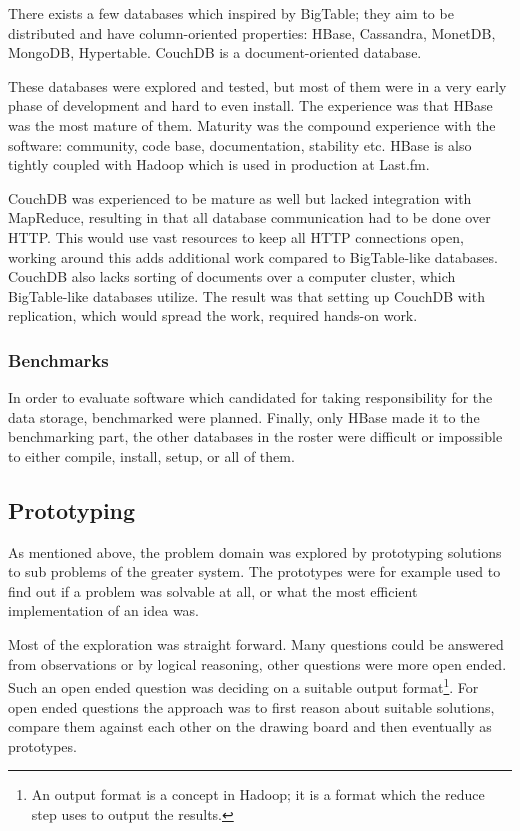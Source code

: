 There exists a few databases which inspired by BigTable; they aim to be
distributed and have column-oriented properties: HBase, Cassandra, MonetDB,
MongoDB, Hypertable. CouchDB is a document-oriented database.

These databases were explored and tested, but most of them were in a very early
phase of development and hard to even install. The experience was that HBase was
the most mature of them. Maturity was the compound experience with the software:
community, code base, documentation, stability etc. HBase is also tightly coupled
with Hadoop which is used in production at Last.fm.

CouchDB was experienced to be mature as well but lacked integration with
MapReduce, resulting in that all database communication had to be done over
HTTP. This would use vast resources to keep all HTTP connections open, working
around this adds additional work compared to BigTable-like databases. CouchDB
also lacks sorting of documents over a computer cluster, which BigTable-like
databases utilize. The result was that setting up CouchDB with replication,
which would spread the work, required hands-on work.


\subsubsection{Benchmarks}

In order to evaluate software which candidated for taking responsibility for the
data storage, benchmarked were planned. Finally, only HBase made it to the
benchmarking part, the other databases in the roster were difficult or
impossible to either compile, install, setup, or all of them.


\subsection*{Prototyping}

As mentioned above, the problem domain was explored by prototyping solutions to
sub problems of the greater system. The prototypes were for example used to find
out if a problem was solvable at all, or what the most efficient implementation
of an idea was.

Most of the exploration was straight forward. Many questions could be answered
from observations or by logical reasoning, other questions were more open ended.
Such an open ended question was deciding on a suitable output format\footnote{An
output format is a concept in Hadoop; it is a format which the reduce step uses
to output the results.}. For open ended questions the approach was to first
reason about suitable solutions, compare them against each other on the drawing
board and then eventually as prototypes.

